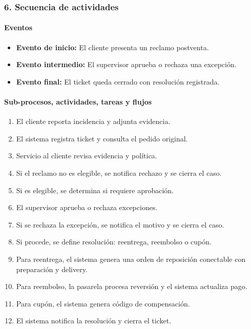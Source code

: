 \documentclass[a4paper,12pt]{article}
\begin{document}
\subsubsection*{6. Secuencia de actividades}

\paragraph{Eventos}

\begin{itemize}
    \item \textbf{Evento de inicio:} El cliente presenta un reclamo postventa.
    \item \textbf{Evento intermedio:} El supervisor aprueba o rechaza una excepción.
    \item \textbf{Evento final:} El ticket queda cerrado con resolución registrada.
\end{itemize}

\paragraph{Sub-procesos, actividades, tareas y flujos}

\begin{enumerate}
    \item El cliente reporta incidencia y adjunta evidencia.
    \item El sistema registra ticket y consulta el pedido original.
    \item Servicio al cliente revisa evidencia y política.
    \item Si el reclamo no es elegible, se notifica rechazo y se cierra el caso.
    \item Si es elegible, se determina si requiere aprobación.
    \item El supervisor aprueba o rechaza excepciones.
    \item Si se rechaza la excepción, se notifica el motivo y se cierra el caso.
    \item Si procede, se define resolución: reentrega, reembolso o cupón.
    \item Para reentrega, el sistema genera una orden de reposición conectable con preparación y delivery.
    \item Para reembolso, la pasarela procesa reversión y el sistema actualiza pago.
    \item Para cupón, el sistema genera código de compensación.
    \item El sistema notifica la resolución y cierra el ticket.
\end{enumerate}
\end{document}
